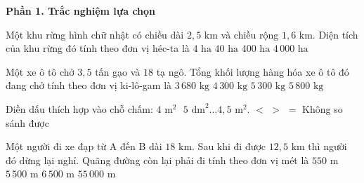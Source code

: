 \textbf{Phần 1. Trắc nghiệm lựa chọn}

\begin{ex} %
Một khu rừng hình chữ nhật có chiều dài $2{,}5\text{ km}$ và chiều rộng $1{,}6\text{ km}$. Diện tích của khu rừng đó tính theo đơn vị héc-ta là
\choice
{$4\text{ ha}$}
{$40\text{ ha}$}
{\True $400\text{ ha}$}
{$4\,000\text{ ha}$}
\end{ex}

\begin{ex} %
Một xe ô tô chở $3{,}5$ tấn gạo và $18$ tạ ngô. Tổng khối lượng hàng hóa xe ô tô đó đang chở tính theo đơn vị ki-lô-gam là
\choice
{$3\,680\text{ kg}$}
{$4\,300\text{ kg}$}
{\True $5\,300\text{ kg}$}
{$5\,800\text{ kg}$}
\end{ex}

\begin{ex} %
Điền dấu thích hợp vào chỗ chấm: $4\text{ m}^2\text{ }5\text{ dm}^2 \dots 4{,}5\text{ m}^2$.
\choice
{\True $<$}
{$>$}
{$=$}
{Không so sánh được}
\end{ex}

\begin{ex} %
Một người đi xe đạp từ A đến B dài $18\text{ km}$. Sau khi đi được $12{,}5\text{ km}$ thì người đó dừng lại nghỉ. Quãng đường còn lại phải đi tính theo đơn vị mét là
\choice
{$550\text{ m}$}
{\True $5\,500\text{ m}$}
{$6\,500\text{ m}$}
{$55\,000\text{ m}$}
\end{ex}

